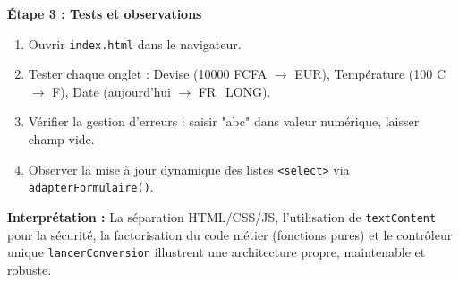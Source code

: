 \documentclass[11pt]{article}
\begin{document}
\begin{experience}
\textbf{Étape 3 : Tests et observations}
\begin{enumerate}
    \item Ouvrir \texttt{index.html} dans le navigateur.
    \item Tester chaque onglet : Devise (10000 FCFA $\rightarrow$ EUR), Température (100 C $\rightarrow$ F), Date (aujourd'hui $\rightarrow$ FR\_LONG).
    \item Vérifier la gestion d'erreurs : saisir "abc" dans valeur numérique, laisser champ vide.
    \item Observer la mise à jour dynamique des listes \texttt{<select>} via \texttt{adapterFormulaire()}.
\end{enumerate}
\textbf{Interprétation :} La séparation HTML/CSS/JS, l'utilisation de \texttt{textContent} pour la sécurité, la factorisation du code métier (fonctions pures) et le contrôleur unique \texttt{lancerConversion} illustrent une architecture propre, maintenable et robuste.
\end{experience}
\end{document}
